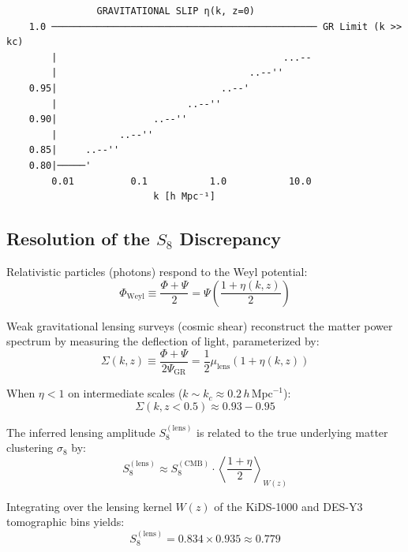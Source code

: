 \documentclass[10pt,twocolumn]{article}
\begin{document}
\begin{verbatim}
                GRAVITATIONAL SLIP η(k, z=0)
    1.0 ─────────────────────────────────────────────── GR Limit (k >> kc)
        |                                        ...--
        |                                  ..--''
    0.95|                             ..--'
        |                       ..--''
    0.90|                 ..--''
        |           ..--''
    0.85|     ..--''
    0.80|─────'
        0.01          0.1           1.0           10.0
                          k [h Mpc⁻¹]
\end{verbatim}


\subsection{Resolution of the $S_8$ Discrepancy}

Relativistic particles (photons) respond to the Weyl potential:
\begin{equation}
  \Phi_{\text{Weyl}} \equiv \frac{\Phi + \Psi}{2} = \Psi \left( \frac{1 + \eta(k,z)}{2} \right)
\end{equation}

Weak gravitational lensing surveys (cosmic shear) reconstruct the matter power spectrum by measuring the deflection of light, parameterized by:
\begin{equation}
  \Sigma(k,z) \equiv \frac{\Phi + \Psi}{2\Psi_{\text{GR}}} = \frac{1}{2} \mu_{\text{lens}} (1 + \eta(k,z))
\end{equation}

When $\eta < 1$ on intermediate scales ($k \sim k_c \approx 0.2 \, h \, \text{Mpc}^{-1}$):
\begin{equation}
  \Sigma(k, z < 0.5) \approx 0.93 - 0.95
\end{equation}

The inferred lensing amplitude $S_8^{(\text{lens})}$ is related to the true underlying matter clustering $\sigma_8$ by:
\begin{equation}
  S_8^{(\text{lens})} \approx S_8^{(\text{CMB})} \cdot \left\langle \frac{1 + \eta}{2} \right\rangle_{W(z)}
\end{equation}

Integrating over the lensing kernel $W(z)$ of the KiDS-1000 and DES-Y3 tomographic bins yields:
\begin{equation}
  S_8^{(\text{lens})} = 0.834 \times 0.935 \approx \mathbf{0.779}
\end{equation}
\end{document}
